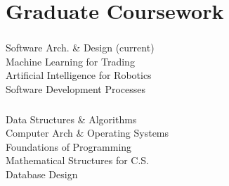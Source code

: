 %
%
%
%
\section{Graduate Coursework}
  \subsubsection{\SchoolAinit}
      {\small
      Software Arch. \& Design (current)\\
      Machine Learning for Trading\\
      Artificial Intelligence for Robotics\\
      Software Development Processes\\
      }
%
%
  {\vspace{-0.5em}}
%
%
  \subsubsection{\SchoolBinit}
      {\small
      Data Structures \& Algorithms\\
      Computer Arch \& Operating Systems\\
      Foundations of Programming\\
      Mathematical Structures for C.S.\\
      Database Design\\
      }
%
%
%
{\vspace{2.5em}}
\profiles%
      {\web\Web}%
      {\github\Github}%
      {\linkedin\Linkedin}%